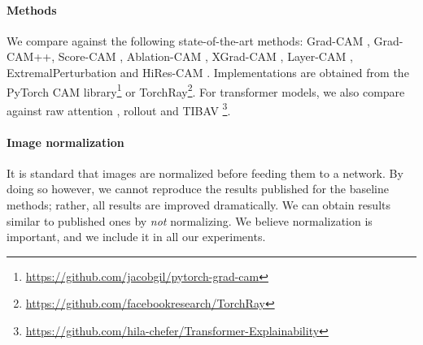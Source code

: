 \paragraph{Methods}

We compare against the following state-of-the-art methods: Grad-CAM \autocite{selvaraju2017grad}, 
Grad-CAM++\cite{chattopadhay2018grad}, Score-CAM \autocite{wang2020score}, Ablation-CAM 
\autocite{ramaswamy2020ablation}, XGrad-CAM \autocite{axiombased}, Layer-CAM 
\autocite{jiang2021layercam}, ExtremalPerturbation \autocite{fong2019understanding} 
and HiRes-CAM \autocite{draelos2020use}. Implementations are obtained from the PyTorch CAM 
library\footnote{\url{https://github.com/jacobgil/pytorch-grad-cam}} or 
TorchRay\footnote{\url{https://github.com/facebookresearch/TorchRay}}. For transformer models, 
we also compare against raw attention \autocite{dosovitskiy2020image}, 
rollout \autocite{abnar2020quantifying} and TIBAV \cite{chefer2021transformer}\footnote{\url{
https://github.com/hila-chefer/Transformer-Explainability}}.

\paragraph{Image normalization}

It is standard that images are normalized before feeding them to a network. By doing so however, 
we cannot reproduce the results published for the baseline methods; rather, all results are 
improved dramatically. We can obtain results similar to published ones by \emph{not} normalizing. 
We believe normalization is important, and we include it in all our experiments. 